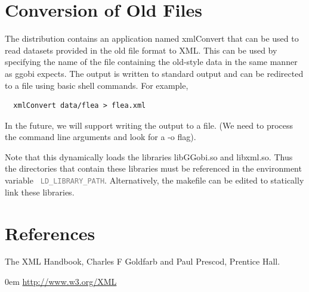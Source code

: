 \documentclass{article}
\def\strip#1>{}
\def\Escape#1{\def\next{#1}%
  {\frenchspacing\expandafter\strip\meaning\next}}
\def\Env#1{{\textcolor{gray}{\texttt{\Escape{#1}}}}}
\begin{document}
\section{Conversion of Old Files}
The distribution contains an application named xmlConvert that can be
used to read datasets provided in the old file format to XML.  This
can be used by specifying the name of the file containing the
old-style data in the same manner as ggobi expects.
The output is written to standard output
and can be redirected to a file using basic shell commands.
For example,
\begin{verbatim}
  xmlConvert data/flea > flea.xml
\end{verbatim}
In the future, we will support writing the output to a file. (We need
to process the command line arguments and look for a -o flag).

Note that this dynamically loads the libraries libGGobi.so and
libxml.so.  Thus the directories that contain these libraries must be
referenced in the environment variable 
\Env{LD_LIBRARY_PATH}.
Alternatively, the makefile can be edited to statically link these
libraries.

\section{References}
The XML Handbook, Charles F Goldfarb and Paul Prescod,
 Prentice Hall.

\vspace{1em} \parindent 0em
\url{http://www.w3.org/XML}
\end{document}
